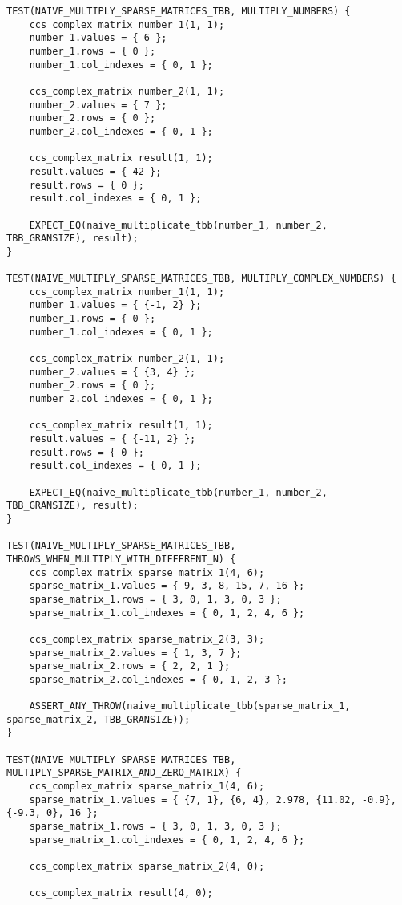 \documentclass{report}
\begin{document}
\begin{lstlisting}
TEST(NAIVE_MULTIPLY_SPARSE_MATRICES_TBB, MULTIPLY_NUMBERS) {
    ccs_complex_matrix number_1(1, 1);
    number_1.values = { 6 };
    number_1.rows = { 0 };
    number_1.col_indexes = { 0, 1 };

    ccs_complex_matrix number_2(1, 1);
    number_2.values = { 7 };
    number_2.rows = { 0 };
    number_2.col_indexes = { 0, 1 };

    ccs_complex_matrix result(1, 1);
    result.values = { 42 };
    result.rows = { 0 };
    result.col_indexes = { 0, 1 };

    EXPECT_EQ(naive_multiplicate_tbb(number_1, number_2, TBB_GRANSIZE), result);
}

TEST(NAIVE_MULTIPLY_SPARSE_MATRICES_TBB, MULTIPLY_COMPLEX_NUMBERS) {
    ccs_complex_matrix number_1(1, 1);
    number_1.values = { {-1, 2} };
    number_1.rows = { 0 };
    number_1.col_indexes = { 0, 1 };

    ccs_complex_matrix number_2(1, 1);
    number_2.values = { {3, 4} };
    number_2.rows = { 0 };
    number_2.col_indexes = { 0, 1 };

    ccs_complex_matrix result(1, 1);
    result.values = { {-11, 2} };
    result.rows = { 0 };
    result.col_indexes = { 0, 1 };

    EXPECT_EQ(naive_multiplicate_tbb(number_1, number_2, TBB_GRANSIZE), result);
}

TEST(NAIVE_MULTIPLY_SPARSE_MATRICES_TBB, THROWS_WHEN_MULTIPLY_WITH_DIFFERENT_N) {
    ccs_complex_matrix sparse_matrix_1(4, 6);
    sparse_matrix_1.values = { 9, 3, 8, 15, 7, 16 };
    sparse_matrix_1.rows = { 3, 0, 1, 3, 0, 3 };
    sparse_matrix_1.col_indexes = { 0, 1, 2, 4, 6 };

    ccs_complex_matrix sparse_matrix_2(3, 3);
    sparse_matrix_2.values = { 1, 3, 7 };
    sparse_matrix_2.rows = { 2, 2, 1 };
    sparse_matrix_2.col_indexes = { 0, 1, 2, 3 };

    ASSERT_ANY_THROW(naive_multiplicate_tbb(sparse_matrix_1, sparse_matrix_2, TBB_GRANSIZE));
}

TEST(NAIVE_MULTIPLY_SPARSE_MATRICES_TBB, MULTIPLY_SPARSE_MATRIX_AND_ZERO_MATRIX) {
    ccs_complex_matrix sparse_matrix_1(4, 6);
    sparse_matrix_1.values = { {7, 1}, {6, 4}, 2.978, {11.02, -0.9}, {-9.3, 0}, 16 };
    sparse_matrix_1.rows = { 3, 0, 1, 3, 0, 3 };
    sparse_matrix_1.col_indexes = { 0, 1, 2, 4, 6 };

    ccs_complex_matrix sparse_matrix_2(4, 0);

    ccs_complex_matrix result(4, 0);


\end{lstlisting}
\end{document}
